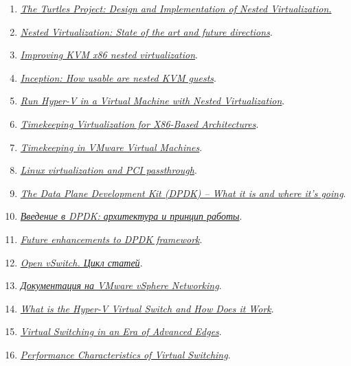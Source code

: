 \documentclass[14pt, a4paper]{article}
\begin{document}
\begin{enumerate}
    \item \href{https://www.usenix.org/legacy/events/osdi10/tech/full_papers/Ben-Yehuda.pdf}{\textit{The Turtles Project: Design and Implementation of Nested Virtualization.}}
    \item \href{https://www.linux-kvm.org/images/3/33/02x03-NestedVirtualization.pdf}{\textit{Nested Virtualization: State of the art and future directions}}.
    \item \href{https://events19.linuxfoundation.org/wp-content/uploads/2017/12/Improving-KVM-x86-Nested-Virtualization-Liran-Alon-Oracle.pdf}{\textit{Improving KVM x86 nested virtualization}}.
    \item \href{https://www.redhat.com/en/blog/inception-how-usable-are-nested-kvm-guests}{\textit{Inception: How usable are nested KVM guests}}.
    \item \href{https://docs.microsoft.com/en-us/virtualization/hyper-v-on-windows/user-guide/nested-virtualization}{\textit{Run Hyper-V in a Virtual Machine with Nested Virtualization}}.
    \item \href{https://www.kernel.org/doc/Documentation/virtual/kvm/timekeeping.txt}{\textit{Timekeeping Virtualization for X86-Based Architectures}}.
    \item \href{https://www.kernel.org/doc/Documentation/virtual/kvm/timekeeping.txt}{\textit{Timekeeping in VMware Virtual Machines}}.
    \item \href{https://developer.ibm.com/tutorials/l-pci-passthrough/}{\textit{Linux virtualization and PCI passthrough}}.
    \item \href{https://it-events.com/system/attachments/files/000/001/102/original/LinuxPiter-DPDK-2015.pdf}{\textit{The Data Plane Development Kit (DPDK) – What it is and where it’s going}}.
    \item \href{https://blog.selectel.ru/vvedenie-v-dpdk-arxitektura-i-princip-raboty/}{\textit{Введение в DPDK: архитектура и принцип работы}}.
    \item \href{https://www.slideshare.net/jstleger/dpdk-summit-2015-intel-keith-wiles}{\textit{Future enhancements to DPDK framework}}.
    \item \href{https://ivirt-it.ru/open-vswitch-cicle/}{\textit{Open vSwitch. Цикл статей}}.
    \item \href{https://docs.vmware.com/en/VMware-vSphere/6.7/com.vmware.vsphere.networking.doc/GUID-35B40B0B-0C13-43B2-BC85-18C9C91BE2D4.html}{\textit{Документация на VMware vSphere Networking}}.
    \item \href{https://www.altaro.com/hyper-v/the-hyper-v-virtual-switch-explained-part-1/}{\textit{What is the Hyper-V Virtual Switch and How Does it Work}}.
    \item \href{http://www.itc22.com/fileadmin/ITC22_files/Edge_Talk-Pettit.pdf}{\textit{Virtual Switching in an Era of Advanced Edges}}.
    \item \href{https://www.net.in.tum.de/fileadmin/bibtex/publications/papers/Open-vSwitch-CloudNet-14.pdf}{\textit{Performance Characteristics of Virtual Switching}}.
\end{enumerate}
\end{document}

